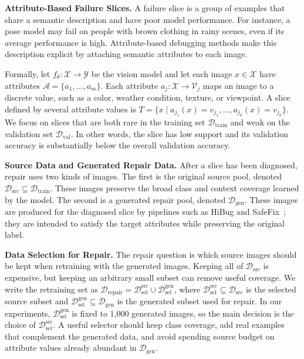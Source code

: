 \documentclass{article}
\newcommand{\dataset}{\mathcal{D}}
\newcommand{\attrs}{\mathcal{A}}
\newcommand{\vals}{\mathcal{V}}
\newcommand{\inputspace}{\mathcal{X}}
\newcommand{\labelspace}{\mathcal{Y}}
\begin{document}
\noindent\textbf{Attribute-Based Failure Slices.} A failure slice is a group of examples that share a semantic description and have poor model performance. For instance, a pose model may fail on people with brown clothing in rainy scenes, even if its average performance is high. Attribute-based debugging methods make this description explicit by attaching semantic attributes to each image.

Formally, let $f_\theta : \inputspace \rightarrow \labelspace$ be the vision model and let each image $x\in\inputspace$ have attributes $\attrs=\{a_1,\ldots,a_m\}$. Each attribute $a_j:\inputspace\rightarrow\vals_j$ maps an image to a discrete value, such as a color, weather condition, texture, or viewpoint. A slice defined by several attribute values is $T = \{x \mid a_{j_1}(x) = v_{j_1}, \ldots, a_{j_k}(x) = v_{j_k}\}$.
We focus on slices that are both rare in the training set $\dataset_{\mathrm{train}}$ and weak on the validation set $\dataset_{\mathrm{val}}$. In other words, the slice has low support and its validation accuracy is substantially below the overall validation accuracy.

\noindent\textbf{Source Data and Generated Repair Data.} After a slice has been diagnosed, repair uses two kinds of images. The first is the original source pool, denoted $\dataset_{\mathrm{src}}\subseteq\dataset_{\mathrm{train}}$. These images preserve the broad class and context coverage learned by the model. The second is a generated repair pool, denoted $\dataset_{\mathrm{gen}}$. These images are produced for the diagnosed slice by pipelines such as HiBug and SafeFix~\citep{chen2023hibug,xu2025safefix}; they are intended to satisfy the target attributes while preserving the original label.

\noindent\textbf{Data Selection for Repair.} The repair question is which source images should be kept when retraining with the generated images. Keeping all of $\dataset_{\mathrm{src}}$ is expensive, but keeping an arbitrary small subset can remove useful coverage. We write the retraining set as $\dataset_{\mathrm{repair}} = \dataset_{\mathrm{sel}}^{\mathrm{src}} \cup \dataset_{\mathrm{sel}}^{\mathrm{gen}}$, where $\dataset_{\mathrm{sel}}^{\mathrm{src}}\subseteq\dataset_{\mathrm{src}}$ is the selected source subset and $\dataset_{\mathrm{sel}}^{\mathrm{gen}}\subseteq\dataset_{\mathrm{gen}}$ is the generated subset used for repair. In our experiments, $\dataset_{\mathrm{sel}}^{\mathrm{gen}}$ is fixed to 1,000 generated images, so the main decision is the choice of $\dataset_{\mathrm{sel}}^{\mathrm{src}}$. A useful selector should keep class coverage, add real examples that complement the generated data, and avoid spending source budget on attribute values already abundant in $\dataset_{\mathrm{gen}}$.
\end{document}
